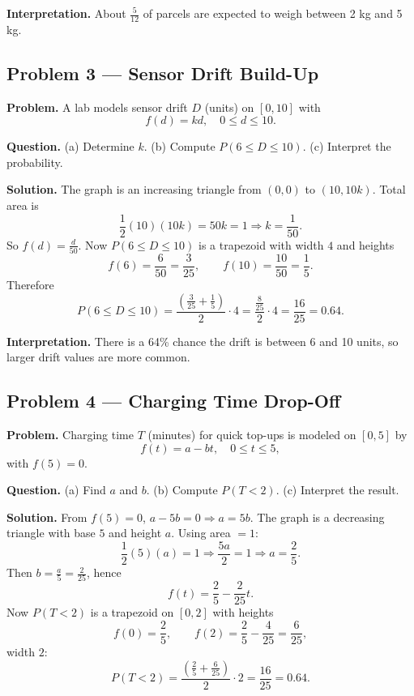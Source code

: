 \begin{ExamProblems}
\textbf{Interpretation.}
About $\frac{5}{12}$ of parcels are expected to weigh between 2 kg and 5 kg.


\item
\subsection*{Problem 3 — Sensor Drift Build-Up}

\textbf{Problem.}
A lab models sensor drift $D$ (units) on $[0,10]$ with
\[
f(d)=kd,\quad 0\le d\le 10.
\]

\textbf{Question.}
(a) Determine $k$. (b) Compute $P(6\le D\le 10)$. (c) Interpret the probability.

\textbf{Solution.}
The graph is an increasing triangle from $(0,0)$ to $(10,10k)$.
Total area is
\[
\frac12(10)(10k)=50k=1\Rightarrow k=\frac{1}{50}.
\]
So $f(d)=\frac{d}{50}$.
Now $P(6\le D\le 10)$ is a trapezoid with width $4$ and heights
\[
f(6)=\frac{6}{50}=\frac{3}{25},\qquad f(10)=\frac{10}{50}=\frac15.
\]
Therefore
\[
P(6\le D\le 10)=\frac{\left(\frac{3}{25}+\frac15\right)}{2}\cdot 4
=\frac{\frac{8}{25}}{2}\cdot 4=\frac{16}{25}=0.64.
\]

\textbf{Interpretation.}
There is a 64\% chance the drift is between 6 and 10 units, so larger drift values are more common.


\item
\subsection*{Problem 4 — Charging Time Drop-Off}

\textbf{Problem.}
Charging time $T$ (minutes) for quick top-ups is modeled on $[0,5]$ by
\[
f(t)=a-bt,\quad 0\le t\le 5,
\]
with $f(5)=0$.

\textbf{Question.}
(a) Find $a$ and $b$. (b) Compute $P(T<2)$. (c) Interpret the result.

\textbf{Solution.}
From $f(5)=0$, $a-5b=0\Rightarrow a=5b$.
The graph is a decreasing triangle with base $5$ and height $a$.
Using area $=1$:
\[
\frac12(5)(a)=1\Rightarrow \frac{5a}{2}=1\Rightarrow a=\frac{2}{5}.
\]
Then $b=\frac{a}{5}=\frac{2}{25}$, hence
\[
f(t)=\frac25-\frac{2}{25}t.
\]
Now $P(T<2)$ is a trapezoid on $[0,2]$ with heights
\[
f(0)=\frac25,\qquad f(2)=\frac25-\frac{4}{25}=\frac{6}{25},
\]
width $2$:
\[
P(T<2)=\frac{\left(\frac25+\frac{6}{25}\right)}{2}\cdot 2
=\frac{16}{25}=0.64.
\]


\end{ExamProblems}
